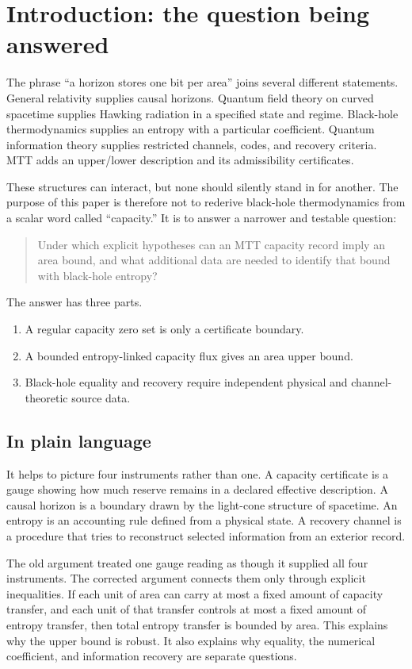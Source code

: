 \documentclass[11pt,a4paper]{article}
\numberwithin{equation}{section}
\theoremstyle{definition}
\theoremstyle{remark}
\begin{document}
\section{Introduction: the question being answered}

The phrase ``a horizon stores one bit per area'' joins several different
statements.  General relativity supplies causal horizons.  Quantum field
theory on curved spacetime supplies Hawking radiation in a specified
state and regime.  Black-hole thermodynamics supplies an entropy with a
particular coefficient.  Quantum information theory supplies restricted
channels, codes, and recovery criteria.  MTT adds an upper/lower
description and its admissibility certificates.

These structures can interact, but none should silently stand in for
another.  The purpose of this paper is therefore not to rederive
black-hole thermodynamics from a scalar word called ``capacity.''  It is
to answer a narrower and testable question:
\begin{quote}
Under which explicit hypotheses can an MTT capacity record imply an area
bound, and what additional data are needed to identify that bound with
black-hole entropy?
\end{quote}

The answer has three parts.
\begin{enumerate}[leftmargin=2em]
\item A regular capacity zero set is only a certificate boundary.
\item A bounded entropy-linked capacity flux gives an area upper bound.
\item Black-hole equality and recovery require independent physical and
  channel-theoretic source data.
\end{enumerate}

\subsection{In plain language}

It helps to picture four instruments rather than one.  A capacity
certificate is a gauge showing how much reserve remains in a declared
effective description.  A causal horizon is a boundary drawn by the
light-cone structure of spacetime.  An entropy is an accounting rule
defined from a physical state.  A recovery channel is a procedure that
tries to reconstruct selected information from an exterior record.

The old argument treated one gauge reading as though it supplied all four
instruments.  The corrected argument connects them only through explicit
inequalities.  If each unit of area can carry at most a fixed amount of
capacity transfer, and each unit of that transfer controls at most a fixed
amount of entropy transfer, then total entropy transfer is bounded by
area.  This explains why the upper bound is robust.  It also explains why
equality, the numerical coefficient, and information recovery are
separate questions.
\end{document}
